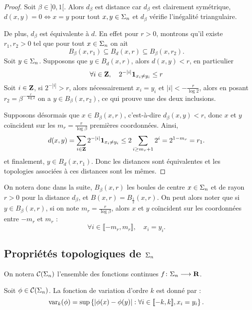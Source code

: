   \begin{proof}
    Soit $\beta \in ]0, 1[$. Alors $d_{\beta}$ est distance car $d_{\beta}$ est clairement symétrique, $d(x, y) = 0 \iff x = y$ pour tout $x,y\in\Sigma_n$
    et $d_{\beta}$ vérifie l'inégalité triangulaire.

    De plus, $d_{\beta}$ est équivalente à $d$. En effet pour $r > 0$, montrons qu'il existe $r_1, r_2 > 0$ tel que pour tout $x \in \Sigma_n$ on ait
    $$B_{\beta}(x, r_1) \subseteq  B_d(x, r) \subseteq B_{\beta}(x, r_2).$$
    Soit $y \in \Sigma_n$. Supposons que $y \in B_d(x, r)$, alors $d(x, y) < r$, en particulier
    $$\forall i \in \mathbf Z, \hspace{1em}2^{-|i|}\mathbf{1}_{x_i \not= y_i} \leq r$$
    Soit $i \in \mathbf Z$, si $2^{-|i|} > r$, alors nécessairement $x_i = y_i$ et $|i| < -\frac{r}{\log{2}}$,
    alors en posant $r_2 = \beta^{-\frac{r}{\log{2}}}$ on a $y \in B_{\beta}(x, r_2)$, ce qui prouve une des deux inclusions.

    Supposons désormais que $x \in B_{\beta}(x, r)$, c'est-à-dire $d_{\beta}(x, y) < r$,
    donc $x$ et $y$ coïncident sur les $m_r = \frac{r}{\log{\beta}}$ premières coordonnées.
    Ainsi,
    $$d(x, y) = \sum_{i\in\mathbf Z}{2^{-|i|}\mathbf{1}_{x_i \not= y_i}} \leq 2\sum_{i \geq m_r + 1}{2^i} = 2^{1 - m_r} = r_1.$$
    et finalement, $y \in B_d(x, r_1)$. Donc les distances sont équivalentes et les topologies associées à ces distances sont les mêmes.
  \end{proof}

  On notera donc dans la suite, $B_{\beta}(x, r)$ les boules de centre $x \in \Sigma_n$ et de rayon $r > 0$ pour la distance $d_{\beta}$,
  et $B(x, r) = B_{\frac 1 2}(x, r)$.
  On peut alors noter que si $y \in B_{\beta}(x, r)$, si on note $m_r = \frac{r}{\log{\beta}}$, alors $x$ et $y$ coïncident sur les coordonnées entre
  $-m_r$ et $m_r$ :
  $$\forall i \in \llbracket -m_r, m_r \rrbracket, \hspace{1em} x_i = y_i.$$

  \subsection{Propriétés topologiques de $\Sigma_n$}

  On notera $\mathcal{C} (\Sigma_{n})$ l'ensemble des fonctions continues $f \colon \Sigma_n \longrightarrow \mathbf R$.

  \begin{definition}
    \label{def:var_potentiel}
    \leanok
    Soit $\phi \in \mathcal{C} (\Sigma_{n})$. La fonction de variation d'ordre $k$ est donné par :
    $$\operatorname{var}_k(\phi) = \sup\left\{|\phi(x) - \phi(y)| : \forall i \in [\![ -k, k]\!], x_i = y_i \right\}.$$
  \end{definition}

